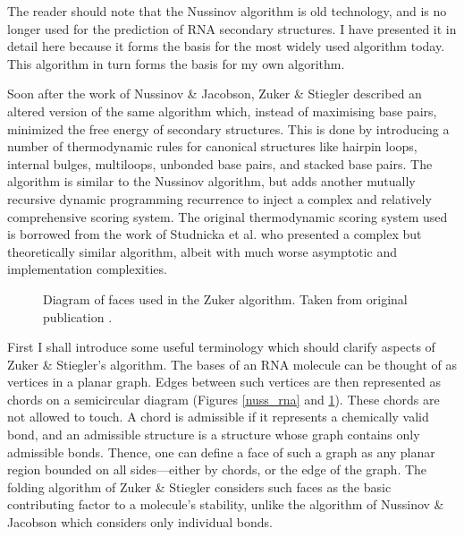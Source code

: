 \documentclass{cshonours}
\begin{document}
The reader should note that the Nussinov algorithm is old technology, and is no longer used for the prediction of RNA secondary structures. I have presented it in detail here because it forms the basis for the most widely used algorithm today. This algorithm in turn forms the basis for my own algorithm.


Soon after the work of Nussinov \& Jacobson, Zuker \& Stiegler \cite{zuker1981optimal}
described an altered version of the same algorithm which, instead of maximising
base pairs, minimized the free energy of secondary structures. This is done
by introducing a number of thermodynamic rules for canonical structures like
hairpin loops, internal bulges, multiloops, unbonded base pairs, and stacked base
pairs. The algorithm is similar to the Nussinov algorithm, but adds another mutually recursive dynamic programming recurrence to inject
a complex and relatively comprehensive scoring system. The original thermodynamic scoring system used is borrowed from the work of Studnicka et al. \cite{studnicka1978computer} who presented a
complex but theoretically similar algorithm, albeit with
much worse asymptotic and implementation complexities. 


\begin{figure}
\begin{center}
\end{center}
\caption{Diagram of faces used in the Zuker algorithm. Taken from original
publication \cite{zuker1981optimal}.}
\label{zuk_struct}
\end{figure}

First I shall introduce some useful terminology which should clarify aspects of Zuker \& Stiegler’s
algorithm. The bases of an RNA molecule can be thought of as vertices in a planar graph. Edges between such vertices are then represented as chords on a semicircular diagram (Figures \ref{nuss_rna} and \ref{zuk_struct}). These chords are not allowed to touch. A chord
is admissible if it represents a chemically valid bond, and an
admissible structure is a structure whose graph contains only admissible bonds.
Thence, one can define a face of such a graph as any planar region bounded on all
sides---either by chords, or the edge of the graph. The
folding algorithm of Zuker \& Stiegler considers such faces as the basic contributing factor to a molecule's stability, unlike the algorithm of Nussinov \& Jacobson
which considers only individual bonds.
\end{document}
